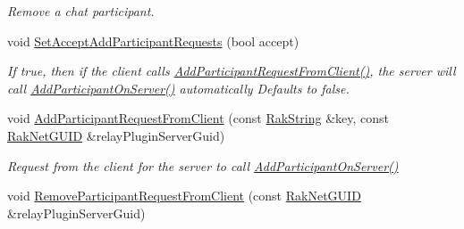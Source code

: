 \begin{DoxyCompactItemize}
\begin{DoxyCompactList}\small\item\em Remove a chat participant. \end{DoxyCompactList}\item 
void \hyperlink{class_rak_net_1_1_relay_plugin_a51987baa3095d72ca8195a69ecb73793}{Set\-Accept\-Add\-Participant\-Requests} (bool accept)
\begin{DoxyCompactList}\small\item\em If true, then if the client calls \hyperlink{class_rak_net_1_1_relay_plugin_a8f0d6808a2fed5dcfabb1c2435ae736e}{Add\-Participant\-Request\-From\-Client()}, the server will call \hyperlink{class_rak_net_1_1_relay_plugin_a8a8b10be11428da1b26e0f9a9e1e133e}{Add\-Participant\-On\-Server()} automatically Defaults to false. \end{DoxyCompactList}\item 
void \hyperlink{class_rak_net_1_1_relay_plugin_a8f0d6808a2fed5dcfabb1c2435ae736e}{Add\-Participant\-Request\-From\-Client} (const \hyperlink{class_rak_net_1_1_rak_string}{Rak\-String} \&key, const \hyperlink{struct_rak_net_1_1_rak_net_g_u_i_d}{Rak\-Net\-G\-U\-I\-D} \&relay\-Plugin\-Server\-Guid)
\begin{DoxyCompactList}\small\item\em Request from the client for the server to call \hyperlink{class_rak_net_1_1_relay_plugin_a8a8b10be11428da1b26e0f9a9e1e133e}{Add\-Participant\-On\-Server()} \end{DoxyCompactList}\item 
\hypertarget{class_rak_net_1_1_relay_plugin_a490a9b9fe571e7d4d720a4f9fb2aac2d}{void \hyperlink{class_rak_net_1_1_relay_plugin_a490a9b9fe571e7d4d720a4f9fb2aac2d}{Remove\-Participant\-Request\-From\-Client} (const \hyperlink{struct_rak_net_1_1_rak_net_g_u_i_d}{Rak\-Net\-G\-U\-I\-D} \&relay\-Plugin\-Server\-Guid)}\label{class_rak_net_1_1_relay_plugin_a490a9b9fe571e7d4d720a4f9fb2aac2d}


\end{DoxyCompactItemize}
